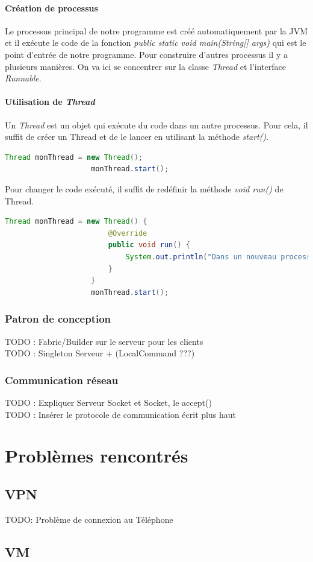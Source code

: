 \documentclass[a4paper, 11pt]{report}
\begin{document}
		\subsubsection{Création de processus}
			Le processus principal de notre programme est créé automatiquement par la JVM et il exécute le code de la fonction \emph{public static void main(String[] args)} qui est le point d'entrée de notre programme.
			Pour construire d'autres processus il y a plusieurs manières. On va ici se concentrer sur la classe \emph{Thread} et l'interface \emph{Runnable}.
		\subsubsection{Utilisation de \emph{Thread}}
			Un \emph{Thread} est un objet qui exécute du code dans un autre processus. Pour cela, il suffit de créer un Thread et de le lancer en utilisant la méthode \emph{start()}.
			\begin{mdframed}[backgroundcolor=light-gray, roundcorner=20pt,
				leftmargin=0, rightmargin=0, 
				innerleftmargin=20, linecolor=darkgray]
				\begin{lstlisting}[language=Java]
					Thread monThread = new Thread();
					monThread.start();
				\end{lstlisting}
			\end{mdframed}
			Pour changer le code exécuté, il suffit de redéfinir la méthode \emph{void run()} de Thread.
			 \begin{mdframed}[backgroundcolor=light-gray, roundcorner=20pt,
				leftmargin=0, rightmargin=0, 
				innerleftmargin=20, linecolor=darkgray]
				\begin{lstlisting}[language=Java]
					Thread monThread = new Thread() {
						@Override
						public void run() {
							System.out.println("Dans un nouveau processus");
						}
					}
					monThread.start();
				\end{lstlisting}
			\end{mdframed}
	\subsection{Patron de conception}
		TODO : Fabric/Builder sur le serveur pour les clients\\
		TODO : Singleton Serveur + (LocalCommand ???)
	\subsection{Communication réseau}
		TODO : Expliquer Serveur Socket et Socket, le accept()\\
		TODO : Insérer le protocole de communication écrit plus haut
\chapter{Problèmes rencontrés}
\section{VPN}
	TODO: Problème de connexion au Téléphone
\section{VM}
\end{document}
